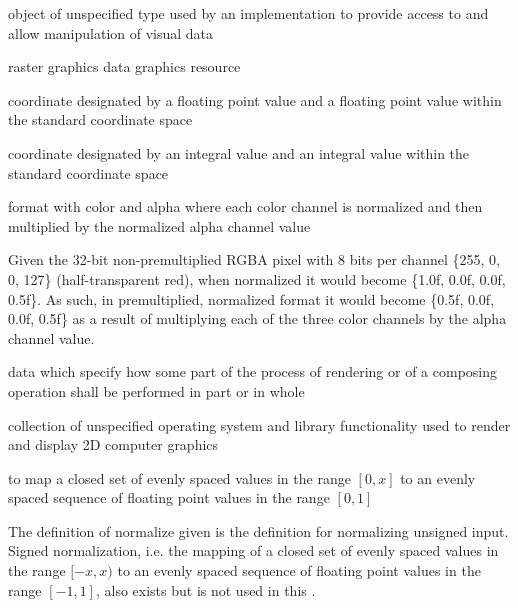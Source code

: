 %
%
 object of unspecified type used by an implementation to provide access to and allow manipulation of visual data

\indexdefn{\pixmap}%
raster graphics data graphics resource

%
 coordinate designated by a floating point \xaxis{} value and a floating point \yaxis{} value within the standard coordinate space

%
 coordinate designated by an integral \xaxis{} value and an integral \yaxis{} value within the standard coordinate space

%
format with color and alpha where each color channel is normalized and then 
multiplied by the normalized alpha channel value
\begin{example}
Given the 32-bit non-premultiplied RGBA pixel with 8 bits per channel \{255, 0, 
0, 127\} (half-transparent red), when normalized it would become \{1.0f, 0.0f, 
0.0f, 0.5f\}. As such, in premultiplied, normalized format it would become 
\{0.5f, 0.0f, 0.0f, 0.5f\} as a result of multiplying each of the three color channels by the alpha channel value.
\end{example}

%
data which specify how some part of the process of rendering or of a composing operation shall be performed in part or in whole

%
collection of unspecified operating system and library functionality used to render and display 2D computer graphics

%
to map a closed set of evenly spaced values in the range $[0, x]$ to an evenly spaced sequence of floating point values in the range $[0, 1]$
\begin{note}
The definition of normalize given is the definition for normalizing unsigned input. Signed normalization, i.e. the mapping of a closed set of evenly spaced values in the range $[-x, x)$ to an evenly spaced sequence of floating point values in the range $[-1, 1]$, also exists but is not used in this \documenttypename{}.
\end{note}

